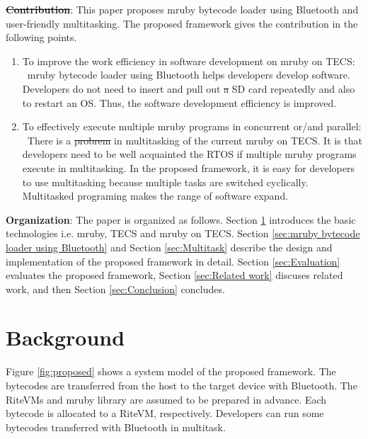 \documentclass[conference,compsoc]{IEEEtran}
\providecommand{\DIFadd}[1]{{\protect\color{blue}\uwave{#1}}} %
\providecommand{\DIFdel}[1]{{\protect\color{red}\sout{#1}}}                      %
\providecommand{\DIFaddbegin}{} %
\providecommand{\DIFaddend}{} %
\providecommand{\DIFdelbegin}{} %
\providecommand{\DIFdelend}{} %
\begin{document}
{\bf \DIFdelbegin \DIFdel{Contribution}\DIFdelend \DIFaddbegin \DIFadd{Contributions}\DIFaddend }: This paper proposes mruby bytecode loader using Bluetooth and user-friendly multitasking.
The proposed framework gives the contribution in the following points.
\begin{enumerate}
\item To improve the  work efficiency in software development on mruby on TECS: \mbox{}\\
\ mruby bytecode loader using Bluetooth helps developers develop software.
Developers do not need to insert and pull out \DIFdelbegin \DIFdel{a }\DIFdelend \DIFaddbegin \DIFadd{an }\DIFaddend SD card repeatedly and also to restart an OS.
Thus, the software development efficiency is improved.
\item To effectively execute multiple mruby programs in concurrent or/and parallel: \mbox{}\\
\ There is a \DIFdelbegin \DIFdel{probrem }\DIFdelend \DIFaddbegin \DIFadd{problem }\DIFaddend in multitasking of the current mruby on TECS.
It is that developers need to be well acquainted the RTOS if multiple mruby programs execute in multitasking.
In the proposed framework, it is easy for developers to use multitasking because multiple tasks are switched cyclically.
Multitasked programing makes the range of software expand.
\end{enumerate}

{\bf Organization}: The paper is organized as follows.
Section \ref{sec:Background} introduces the basic technologies i.e. mruby, TECS and mruby on TECS.
Section \ref{sec:mruby bytecode loader using Bluetooth} and Section \ref{sec:Multitask} describe the design and implementation of the proposed framework in detail.
Section \ref{sec:Evaluation} evaluates the proposed framework, Section \ref{sec:Related work} discuses related work, and then Section \ref{sec:Conclusion} concludes.

\section{Background}
\label{sec:Background}
Figure \ref{fig:proposed} shows a system model of the proposed framework.
The bytecodes are transferred from the host to the target device with Bluetooth.
The RiteVMs and mruby library are assumed to be prepared in advance.
Each bytecode is allocated to a RiteVM, respectively.
Developers can run some bytecodes transferred with Bluetooth in multitask.
\end{document}
